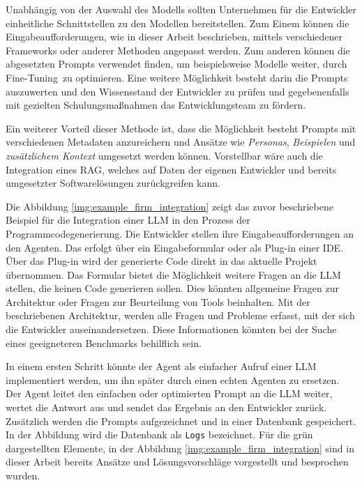 Unabhängig von der Auswahl des Modells sollten Unternehmen für die Entwickler einheitliche Schnittstellen zu den Modellen bereitstellen. Zum Einem können die Eingabeaufforderungen, wie in dieser Arbeit beschrieben, mittels verschiedener Frameworks oder anderer Methoden angepasst werden. Zum anderen können die abgesetzten Prompts verwendet finden, um beispielsweise Modelle weiter, durch \glqq Fine-Tuning\grqq \ zu optimieren. Eine weitere Möglichkeit besteht darin die Prompts auszuwerten und den Wissensstand der Entwickler zu prüfen und gegebenenfalls mit gezielten Schulungsmaßnahmen das Entwicklungsteam zu fördern.\vspace{0.2cm}

Ein weiterer Vorteil dieser Methode ist, dass die Möglichkeit besteht Prompts mit verschiedenen Metadaten anzureichern und Ansätze wie \textit{Personas}, \textit{Beispielen} und \textit{zusätzlichem Kontext} umgesetzt werden können. Vorstellbar wäre auch die Integration eines RAG, welches auf Daten der eigenen Entwickler und bereits umgesetzter Softwarelösungen zurückgreifen kann.\vspace{0.2cm}

Die Abbildung \ref{img:example_firm_integration} zeigt das zuvor beschriebene Beispiel für die Integration einer LLM in den Prozess der Programmcodegenerierung. Die Entwickler stellen ihre Eingabeaufforderungen an den Agenten. Das erfolgt über ein Eingabeformular oder als Plug-in einer IDE. Über das Plug-in wird der generierte Code direkt in das aktuelle Projekt übernommen. Das Formular bietet die Möglichkeit weitere Fragen an die LLM stellen, die keinen Code generieren sollen. Dies könnten allgemeine Fragen zur Architektur oder Fragen zur Beurteilung von Tools beinhalten. Mit der beschriebenen Architektur, werden alle Fragen und Probleme erfasst, mit der sich die Entwickler auseinandersetzen. Diese Informationen könnten bei der Suche eines geeigneteren Benchmarks behilflich sein.\vspace{0.2cm}

In einem ersten Schritt könnte der Agent als einfacher Aufruf einer LLM implementiert werden, um ihn später durch einen echten Agenten zu ersetzen. Der Agent leitet den einfachen oder optimierten Prompt an die LLM weiter, wertet die Antwort aus und sendet das Ergebnis an den Entwickler zurück. Zusätzlich werden die Prompts aufgezeichnet und in einer Datenbank gespeichert. In der Abbildung wird die Datenbank als \texttt{Logs} bezeichnet. Für die grün dargestellten Elemente, in der Abbildung \ref{img:example_firm_integration} sind in dieser Arbeit bereits Ansätze und Lösungsvorschläge vorgestellt und besprochen wurden.\vspace{0.2cm}

